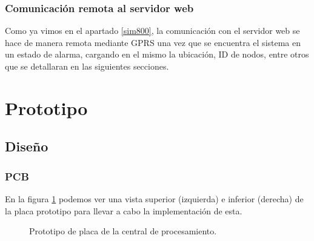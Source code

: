\subsubsection{Comunicación remota al servidor web}
\par Como ya vimos en el apartado \ref{sim800}, la comunicación con el servidor web se hace de manera remota mediante GPRS una vez que se encuentra el sistema en un estado de alarma, cargando en el mismo la ubicación, ID de nodos, entre otros que se detallaran en las siguientes secciones. 

\section{Prototipo}
\subsection{Diseño}
\subsubsection{PCB}
\par En la figura \ref{im:pcb-prototipo} podemos ver una vista superior (izquierda) e inferior (derecha) de la placa prototipo para llevar a cabo la implementación de esta. 
\begin{figure}[h!]
\begin{center}
    \caption{Prototipo de placa de la central de procesamiento.}
	\label{im:pcb-prototipo}
\end{center}
\end{figure}

